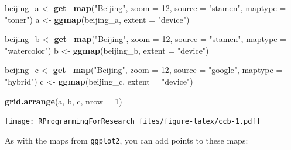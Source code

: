 \documentclass[]{book}
\makeatletter
\newenvironment{Shaded}{\begin{snugshade}}{\end{snugshade}}
\newcommand{\KeywordTok}[1]{\textcolor[rgb]{0.13,0.29,0.53}{\textbf{#1}}}
\newcommand{\DataTypeTok}[1]{\textcolor[rgb]{0.13,0.29,0.53}{#1}}
\newcommand{\DecValTok}[1]{\textcolor[rgb]{0.00,0.00,0.81}{#1}}
\newcommand{\StringTok}[1]{\textcolor[rgb]{0.31,0.60,0.02}{#1}}
\newcommand{\NormalTok}[1]{#1}
\newenvironment{kframe}{%
\medskip{}
\setlength{\fboxsep}{.8em}
 \def\at@end@of@kframe{}%
 \ifinner\ifhmode%
  \def\at@end@of@kframe{\end{minipage}}%
  \begin{minipage}{\columnwidth}%
 \fi\fi%
 \def\FrameCommand##1{\hskip\@totalleftmargin \hskip-\fboxsep
 \colorbox{shadecolor}{##1}\hskip-\fboxsep
     \hskip-\linewidth \hskip-\@totalleftmargin \hskip\columnwidth}%
 \MakeFramed {\advance\hsize-\width
   \@totalleftmargin\z@ \linewidth\hsize
   \@setminipage}}%
 {\par\unskip\endMakeFramed%
 \at@end@of@kframe}
\renewenvironment{Shaded}{\begin{kframe}}{\end{kframe}}
\theoremstyle{definition}
\theoremstyle{definition}
\theoremstyle{definition}
\theoremstyle{remark}
\makeatother
\begin{document}
\begin{Shaded}
\begin{Highlighting}[]
\NormalTok{beijing_a <-}\StringTok{ }\KeywordTok{get_map}\NormalTok{(}\StringTok{"Beijing"}\NormalTok{, }\DataTypeTok{zoom =} \DecValTok{12}\NormalTok{,}
                     \DataTypeTok{source =} \StringTok{"stamen"}\NormalTok{, }\DataTypeTok{maptype =} \StringTok{"toner"}\NormalTok{)}
\NormalTok{a <-}\StringTok{ }\KeywordTok{ggmap}\NormalTok{(beijing_a, }\DataTypeTok{extent =} \StringTok{"device"}\NormalTok{)}

\NormalTok{beijing_b <-}\StringTok{ }\KeywordTok{get_map}\NormalTok{(}\StringTok{"Beijing"}\NormalTok{, }\DataTypeTok{zoom =} \DecValTok{12}\NormalTok{,}
                     \DataTypeTok{source =} \StringTok{"stamen"}\NormalTok{, }\DataTypeTok{maptype =} \StringTok{"watercolor"}\NormalTok{)}
\NormalTok{b <-}\StringTok{ }\KeywordTok{ggmap}\NormalTok{(beijing_b, }\DataTypeTok{extent =} \StringTok{"device"}\NormalTok{)}

\NormalTok{beijing_c <-}\StringTok{ }\KeywordTok{get_map}\NormalTok{(}\StringTok{"Beijing"}\NormalTok{, }\DataTypeTok{zoom =} \DecValTok{12}\NormalTok{,}
                     \DataTypeTok{source =} \StringTok{"google"}\NormalTok{, }\DataTypeTok{maptype =} \StringTok{"hybrid"}\NormalTok{)}
\NormalTok{c <-}\StringTok{ }\KeywordTok{ggmap}\NormalTok{(beijing_c, }\DataTypeTok{extent =} \StringTok{"device"}\NormalTok{)}
\end{Highlighting}
\end{Shaded}

\begin{Shaded}
\begin{Highlighting}[]
\KeywordTok{grid.arrange}\NormalTok{(a, b, c, }\DataTypeTok{nrow =} \DecValTok{1}\NormalTok{) }
\end{Highlighting}
\end{Shaded}

\texttt{[image: RProgrammingForResearch\_files/figure-latex/ccb-1.pdf]}

As with the maps from \texttt{ggplot2}, you can add points to these
maps:
\end{document}
